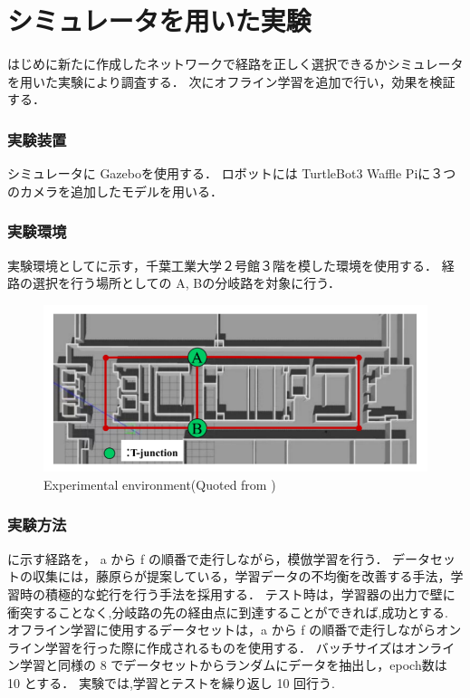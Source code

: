 \section{シミュレータを用いた実験}
はじめに新たに作成したネットワークで経路を正しく選択できるかシミュレータを用いた実験により調査する．
次にオフライン学習を追加で行い，効果を検証する．

\subsubsection{実験装置}
シミュレータに Gazebo\cite{gazebo}を使用する．
ロボットには TurtleBot3 Waffle Pi\cite{turtlebot3}に３つのカメラを追加したモデルを用いる．

\subsubsection{実験環境}
実験環境としてに示す，千葉工業大学２号館３階を模した環境を使用する．
経路の選択を行う場所としての A, Bの分岐路を対象に行う．

\begin{figure}
  \centering
  \includegraphics[width=130mm]{images/pdf/haruyama/cit3f.pdf}
  \caption{Experimental environment(Quoted from \cite{haruyama2022})}
  \label{fig:haruyama_cit3f}
\end{figure}
 
\newpage
\subsubsection{実験方法}
に示す経路を， a から f の順番で走行しながら，模倣学習を行う．
データセットの収集には，藤原ら\cite{fujiwara2023}が提案している，学習データの不均衡を改善する手法，学習時の積極的な蛇行を行う手法を採用する．
テスト時は，学習器の出力で壁に衝突することなく,分岐路の先の経由点に到達することができれば,成功とする.
オフライン学習に使用するデータセットは，a から f の順番で走行しながらオンライン学習を行った際に作成されるものを使用する．
バッチサイズはオンライン学習と同様の 8 でデータセットからランダムにデータを抽出し，epoch数は 10 とする．
実験では,学習とテストを繰り返し 10 回行う.

